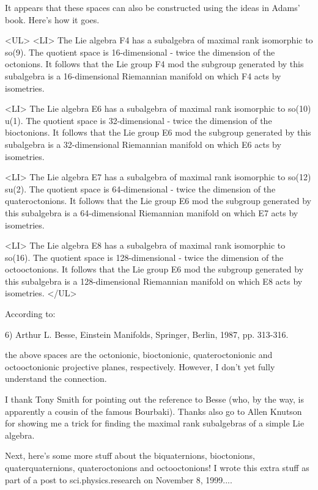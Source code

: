 It appears that these spaces can also be constructed using the 
ideas in Adams' book.  Here's how it goes.   

<UL>
<LI>
The Lie algebra F4 has a subalgebra of maximal rank isomorphic to
so(9).  The quotient space is 16-dimensional - twice the dimension
of the octonions.  It follows that the Lie group F4 mod the subgroup
generated by this subalgebra is a 16-dimensional Riemannian manifold
on which F4 acts by isometries.

<LI>
The Lie algebra E6 has a subalgebra of maximal rank isomorphic to
so(10) \oplus  u(1).  The quotient space is 32-dimensional - twice the
dimension of the bioctonions.  It follows that the Lie group E6 mod
the subgroup generated by this subalgebra is a 32-dimensional
Riemannian manifold on which E6 acts by isometries.
  
<LI>
The Lie algebra E7 has a subalgebra of maximal rank isomorphic to
so(12) \oplus  su(2).  The quotient space is 64-dimensional - twice the
dimension of the quateroctonions.  It follows that the Lie group E6
mod the subgroup generated by this subalgebra is a 64-dimensional
Riemannian manifold on which E7 acts by isometries.

<LI>
The Lie algebra E8 has a subalgebra of maximal rank isomorphic to so(16).  
The quotient space is 128-dimensional - twice the dimension of
the octooctonions.  It follows that the Lie group E6 mod the 
subgroup generated by this subalgebra is a 128-dimensional Riemannian
manifold on which E8 acts by isometries.  
</UL>

According to:

6) Arthur L. Besse, Einstein Manifolds, Springer, Berlin, 1987, pp.
313-316.

the above spaces are the octonionic, bioctonionic, quateroctonionic
and octooctonionic projective planes, respectively.  However, I don't
yet fully understand the connection.

I thank Tony Smith for pointing out the reference to Besse
(who, by the way, is apparently a cousin of the famous Bourbaki).
Thanks also go to Allen Knutson for showing me a trick for finding
the maximal rank subalgebras of a simple Lie algebra.  

Next, here's some more stuff about the
biquaternions, bioctonions, quaterquaternions, quateroctonions
and octooctonions!  
I wrote this extra stuff as part of a post to sci.physics.research on
November 8, 1999....

